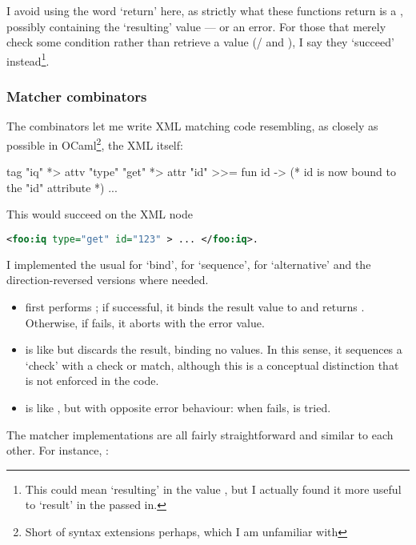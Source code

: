 I avoid using the word `return' here, as strictly what these functions return is a , possibly containing the `resulting' value --- or an error. For those that merely check some condition rather than retrieve a value (/ and ), I say they `succeed' instead\footnote{This could mean `resulting' in the value \code{()}, but I actually found it more useful to `result' in the  passed in.}.

\subsubsection{Matcher combinators}
The combinators let me write XML matching code resembling, as closely as possible in OCaml\footnote{Short of syntax extensions perhaps, which I am unfamiliar with}, the XML itself:

\begin{ocaml}
tag "iq" *> attv "type" "get" *> attr "id" >>= fun id ->
  (* id is now bound to the "id" attribute *)
  ...
\end{ocaml}

This would succeed on the XML node
\begin{lstlisting}[language=xml]
<foo:iq type="get" id="123" > ... </foo:iq>.
\end{lstlisting}

I implemented the usual \code{>>=} for `bind', \code{*>} for `sequence', \code{<|>} for `alternative' and the direction-reversed versions where needed.

\begin{itemize}
  \item {} first performs ; if successful, it binds the result value to  and returns . Otherwise, if  fails, it aborts with the error value.

  \item {} is like \code{>>=} but discards the result, binding no values. In this sense, it sequences a `check' with a check or match, although this is a conceptual distinction that is not enforced in the code.

  \item {} is like \code{*>}, but with opposite error behaviour: when  fails,  is tried.
\end{itemize}

The matcher implementations are all fairly straightforward and similar to each other. For instance, :

